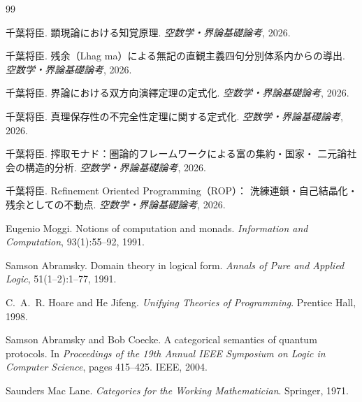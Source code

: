 \documentclass[11pt,a4paper]{article}
\theoremstyle{definition}
\begin{document}
\begin{thebibliography}{99}

千葉将臣.
\newblock 顕現論における知覚原理.
\newblock \emph{空数学・界論基礎論考}, 2026.

千葉将臣.
\newblock 残余（Lhag ma）による無記の直観主義四句分別体系内からの導出.
\newblock \emph{空数学・界論基礎論考}, 2026.

千葉将臣.
\newblock 界論における双方向演繹定理の定式化.
\newblock \emph{空数学・界論基礎論考}, 2026.

千葉将臣.
\newblock 真理保存性の不完全性定理に関する定式化.
\newblock \emph{空数学・界論基礎論考}, 2026.

千葉将臣.
\newblock 搾取モナド：圏論的フレームワークによる富の集約・国家・
二元論社会の構造的分析.
\newblock \emph{空数学・界論基礎論考}, 2026.

千葉将臣.
\newblock Refinement Oriented Programming（ROP）：
洗練連鎖・自己結晶化・残余としての不動点.
\newblock \emph{空数学・界論基礎論考}, 2026.

Eugenio Moggi.
\newblock Notions of computation and monads.
\newblock \emph{Information and Computation}, 93(1):55--92, 1991.

Samson Abramsky.
\newblock Domain theory in logical form.
\newblock \emph{Annals of Pure and Applied Logic}, 51(1--2):1--77, 1991.

C.~A.~R. Hoare and He Jifeng.
\newblock \emph{Unifying Theories of Programming}.
\newblock Prentice Hall, 1998.

Samson Abramsky and Bob Coecke.
\newblock A categorical semantics of quantum protocols.
\newblock In \emph{Proceedings of the 19th Annual IEEE Symposium on
Logic in Computer Science}, pages 415--425. IEEE, 2004.

Saunders Mac Lane.
\newblock \emph{Categories for the Working Mathematician}.
\newblock Springer, 1971.

\end{thebibliography}
\end{document}
